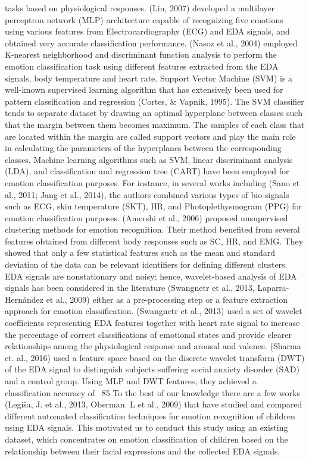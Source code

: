 tasks based on physiological responses. (Lin, 2007) developed a multilayer perceptron 
network (MLP) architecture capable of recognizing five emotions using various features 
from Electrocardiography (ECG) and EDA signals, and obtained very accurate classification 
performance. (Nasoz et al., 2004) employed K-nearest neighborhood and discriminant 
function analysis to perform the emotion classification task using different features 
extracted from the EDA signals, body temperature and heart rate.
Support Vector Machine (SVM) is a well-known supervised learning algorithm that has 
extensively been used for pattern classification and regression (Cortes, \& Vapnik, 
1995). The SVM classifier tends to separate dataset by drawing an optimal hyperplane 
between classes such that the margin between them becomes maximum. The samples of 
each class that are located within the margin are called support vectors and play the 
main role in calculating the parameters of the hyperplanes between the corresponding 
classes. Machine learning algorithms such as SVM, linear discriminant analysis (LDA), 
and classification and regression tree (CART) have been employed for emotion 
classification purposes. For instance, in several works including (Sano et al., 2011; 
Jang et al., 2014), the authors combined various types of bio-signals such as ECG, 
skin temperature (SKT), HR, and Photoplethysmogram (PPG) for  emotion classification 
purposes. (Amershi et al., 2006) proposed unsupervised clustering methods for emotion 
recognition. Their method benefited from several features obtained from different 
body responses such as SC, HR, and EMG. They showed that only a few statistical 
features such as the mean and standard deviation of the data can be relevant identifiers 
for defining different clusters. 
EDA signals are nonstationary and noisy; hence, wavelet-based analysis of EDA signals 
has been considered in the literature (Swangnetr et al., 2013, Laparra-Hernández et al., 2009) 
either as a pre-processing step or a feature extraction approach for emotion classification. 
(Swangnetr et al., 2013) used a set of wavelet coefficients representing EDA features 
together with heart rate signal to increase the percentage of correct classifications 
of emotional states and provide clearer relationships among the physiological response 
and arousal and valence. (Sharma et. al., 2016) used a feature space based on the 
discrete wavelet transform (DWT) of the EDA signal to distinguish subjects suffering 
social anxiety disorder (SAD) and a control group. Using MLP and DWT features, they 
achieved a classification accuracy of ~85%
To the best of our knowledge there are a few works (Legiša, J. et al., 2013, 
Oberman. L et al., 2009) that have studied and compared different automated 
classification techniques for emotion recognition of children using EDA signals. 
This motivated us to conduct this study using an existing dataset, which concentrates 
on emotion classification of children based on the relationship between their facial 
expressions and the collected EDA signals.


